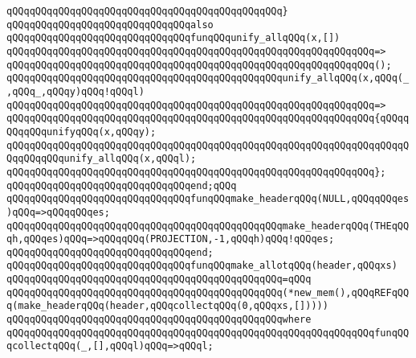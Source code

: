 \verb|qQQqqQQqqQQqqQQqqQQqqQQqqQQqqQQqqQQqqQQqqQQqqQQq}|\newline
\newline
\verb|qQQqqQQqqQQqqQQqqQQqqQQqqQQqqQQqalso|\newline
\verb|qQQqqQQqqQQqqQQqqQQqqQQqqQQqqQQqfunqQQqunify_allqQQq(x,[])|\newline
\verb|qQQqqQQqqQQqqQQqqQQqqQQqqQQqqQQqqQQqqQQqqQQqqQQqqQQqqQQqqQQqqQQq=>|\newline
\verb|qQQqqQQqqQQqqQQqqQQqqQQqqQQqqQQqqQQqqQQqqQQqqQQqqQQqqQQqqQQqqQQq();|\newline
\newline
\verb|qQQqqQQqqQQqqQQqqQQqqQQqqQQqqQQqqQQqqQQqqQQqqQQqunify_allqQQq(x,qQQq(_,qQQq_,qQQqy)qQQq!qQQql)|\newline
\verb|qQQqqQQqqQQqqQQqqQQqqQQqqQQqqQQqqQQqqQQqqQQqqQQqqQQqqQQqqQQqqQQq=>|\newline
\verb|qQQqqQQqqQQqqQQqqQQqqQQqqQQqqQQqqQQqqQQqqQQqqQQqqQQqqQQqqQQqqQQq{qQQqqQQqqQQqunifyqQQq(x,qQQqy);|\newline
\verb|qQQqqQQqqQQqqQQqqQQqqQQqqQQqqQQqqQQqqQQqqQQqqQQqqQQqqQQqqQQqqQQqqQQqqQQqqQQqqQQqunify_allqQQq(x,qQQql);|\newline
\verb|qQQqqQQqqQQqqQQqqQQqqQQqqQQqqQQqqQQqqQQqqQQqqQQqqQQqqQQqqQQqqQQq};|\newline
\verb|qQQqqQQqqQQqqQQqqQQqqQQqqQQqqQQqend;qQQq|\newline
\newline
\verb|qQQqqQQqqQQqqQQqqQQqqQQqqQQqqQQqfunqQQqmake_headerqQQq(NULL,qQQqqQQqes)qQQq=>qQQqqQQqes;|\newline
\verb|qQQqqQQqqQQqqQQqqQQqqQQqqQQqqQQqqQQqqQQqqQQqqQQqmake_headerqQQq(THEqQQqh,qQQqes)qQQq=>qQQqqQQq(PROJECTION,-1,qQQqh)qQQq!qQQqes;|\newline
\verb|qQQqqQQqqQQqqQQqqQQqqQQqqQQqqQQqend;|\newline
\newline
\verb|qQQqqQQqqQQqqQQqqQQqqQQqqQQqqQQqfunqQQqmake_allotqQQq(header,qQQqxs)|\newline
\verb|qQQqqQQqqQQqqQQqqQQqqQQqqQQqqQQqqQQqqQQqqQQqqQQq=qQQq|\newline
\verb|qQQqqQQqqQQqqQQqqQQqqQQqqQQqqQQqqQQqqQQqqQQqqQQq(*new_mem(),qQQqREFqQQq(make_headerqQQq(header,qQQqcollectqQQq(0,qQQqxs,[]))))|\newline
\verb|qQQqqQQqqQQqqQQqqQQqqQQqqQQqqQQqqQQqqQQqqQQqqQQqwhere|\newline
\verb|qQQqqQQqqQQqqQQqqQQqqQQqqQQqqQQqqQQqqQQqqQQqqQQqqQQqqQQqqQQqqQQqfunqQQqcollectqQQq(_,[],qQQql)qQQq=>qQQql;|\newline
